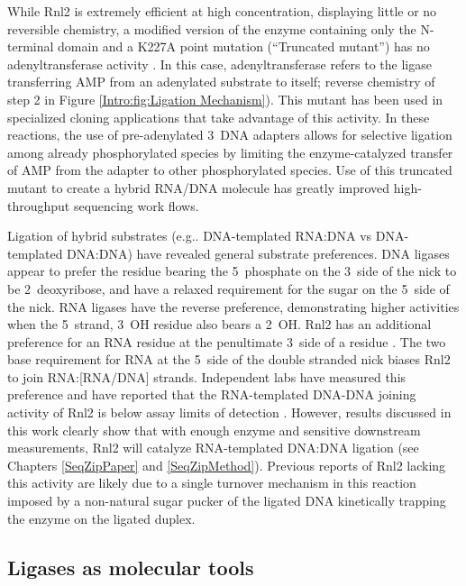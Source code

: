     While Rnl2 is extremely efficient at high concentration, displaying little or no reversible chemistry, a modified version of the enzyme containing only the N-terminal domain and a K227A point mutation (``Truncated mutant'') has no adenyltransferase activity \citep{Viollet2011}. In this case, adenyltransferase refers to the ligase transferring AMP from an adenylated substrate to itself; reverse chemistry of step 2 in Figure \ref{Intro:fig:Ligation Mechanism}). This mutant has been used in specialized cloning applications \citep{Ghildiyal2008, Hafner2008a, Viollet2011} that take advantage of this activity. In these reactions, the use of pre-adenylated 3\textprime~DNA adapters allows for selective ligation among already phosphorylated species by limiting the enzyme-catalyzed transfer of AMP from the adapter to other phosphorylated species. Use of this truncated mutant to create a hybrid RNA/DNA molecule has greatly improved high-throughput sequencing work flows.

    Ligation of hybrid substrates (e.g.. DNA-templated RNA:DNA vs DNA-templated DNA:DNA) have revealed general substrate preferences. DNA ligases appear to prefer the residue bearing the 5\textprime~phosphate on the 3\textprime~side of the nick to be 2\textprime~deoxyribose, and have a relaxed requirement for the sugar on the 5\textprime~side of the nick. RNA ligases have the reverse preference, demonstrating higher activities when the 5\textprime~strand, 3\textprime~OH residue also bears a 2\textprime~OH. Rnl2 has an additional preference for an RNA residue at the penultimate 3\textprime~side of a residue \citep{Ho2002b,Ho2004, Nandakumar2004a, Nandakumar2006}. The two base requirement for RNA at the 5\textprime~side of the double stranded nick biases Rnl2 to join RNA:[RNA/DNA] strands. Independent labs have measured this preference and have reported that the RNA-templated DNA-DNA joining activity of Rnl2 is below assay limits of detection \citep{Bullard2006}. However, results discussed in this work clearly show that with enough enzyme and sensitive downstream measurements, Rnl2 will catalyze RNA-templated DNA:DNA ligation (see Chapters \ref{SeqZipPaper} and \ref{SeqZipMethod}). Previous reports of Rnl2 lacking this activity are likely due to a single turnover mechanism in this reaction imposed by a non-natural sugar pucker of the ligated DNA kinetically trapping the enzyme on the ligated duplex.

  \subsection{Ligases as molecular tools}

